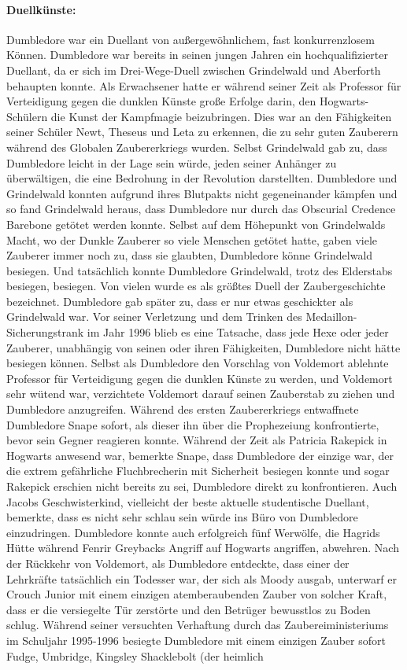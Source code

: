 \documentclass[a4paper, 10pt]{article}
\begin{document}
\paragraph{Duellkünste:}
Dumbledore war ein Duellant von außergewöhnlichem, fast konkurrenzlosem Können. Dumbledore war bereits in seinen jungen Jahren ein hochqualifizierter Duellant, da er sich im Drei-Wege-Duell zwischen Grindelwald und Aberforth behaupten konnte. Als Erwachsener hatte er während seiner Zeit als Professor für Verteidigung gegen die dunklen Künste große Erfolge darin, den Hogwarts-Schülern die Kunst der Kampfmagie beizubringen. Dies war an den Fähigkeiten seiner Schüler Newt, Theseus und Leta zu erkennen, die zu sehr guten Zauberern während des Globalen Zaubererkriegs wurden. Selbst Grindelwald gab zu, dass Dumbledore leicht in der Lage sein würde, jeden seiner Anhänger zu überwältigen, die eine Bedrohung in der Revolution darstellten. Dumbledore und Grindelwald konnten aufgrund ihres Blutpakts nicht gegeneinander kämpfen und so fand Grindelwald heraus, dass Dumbledore nur durch das Obscurial Credence Barebone getötet werden konnte. Selbst auf dem Höhepunkt von Grindelwalds Macht, wo der Dunkle Zauberer so viele Menschen getötet hatte, gaben viele Zauberer immer noch zu, dass sie glaubten, Dumbledore könne Grindelwald besiegen. Und tatsächlich konnte Dumbledore Grindelwald, trotz des Elderstabs besiegen, besiegen. Von vielen wurde es als größtes Duell der Zaubergeschichte bezeichnet. Dumbledore gab später zu, dass er nur etwas geschickter als Grindelwald war. Vor seiner Verletzung und dem Trinken des Medaillon-Sicherungstrank im Jahr 1996 blieb es eine Tatsache, dass jede Hexe oder jeder Zauberer, unabhängig von seinen oder ihren Fähigkeiten, Dumbledore nicht hätte besiegen können. Selbst als Dumbledore den Vorschlag von Voldemort ablehnte Professor für Verteidigung gegen die dunklen Künste zu werden, und Voldemort sehr wütend war, verzichtete Voldemort darauf seinen Zauberstab zu ziehen und Dumbledore anzugreifen. Während des ersten Zaubererkriegs entwaffnete Dumbledore Snape sofort, als dieser ihn über die Prophezeiung konfrontierte, bevor sein Gegner reagieren konnte. Während der Zeit als Patricia Rakepick in Hogwarts anwesend war, bemerkte Snape, dass Dumbledore der einzige war, der die extrem gefährliche Fluchbrecherin mit Sicherheit besiegen konnte und sogar Rakepick erschien nicht bereits zu sei, Dumbledore direkt zu konfrontieren. Auch Jacobs Geschwisterkind, vielleicht der beste aktuelle studentische Duellant, bemerkte, dass es nicht sehr schlau sein würde ins Büro von Dumbledore einzudringen. Dumbledore konnte auch erfolgreich fünf Werwölfe, die Hagrids Hütte während Fenrir Greybacks Angriff auf Hogwarts angriffen, abwehren. Nach der Rückkehr von Voldemort, als Dumbledore entdeckte, dass einer der Lehrkräfte tatsächlich ein Todesser war, der sich als Moody ausgab, unterwarf er Crouch Junior mit einem einzigen atemberaubenden Zauber von solcher Kraft, dass er die versiegelte Tür zerstörte und den Betrüger bewusstlos zu Boden schlug. Während seiner versuchten Verhaftung durch das Zaubereiministeriums im Schuljahr 1995-1996 besiegte Dumbledore mit einem einzigen Zauber sofort Fudge, Umbridge, Kingsley Shacklebolt (der heimlich 
\end{document}
